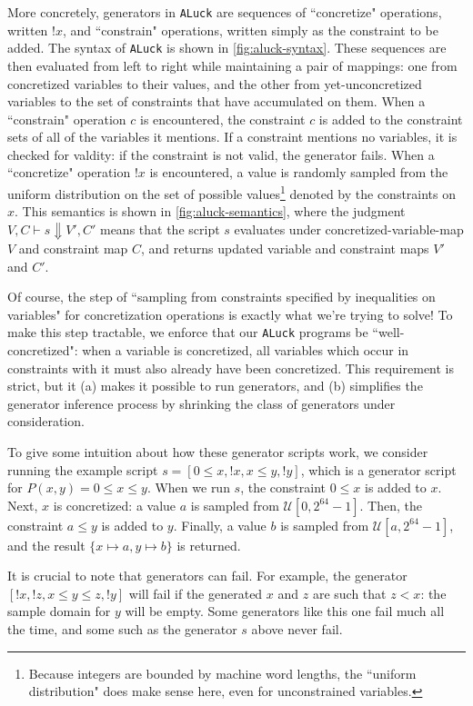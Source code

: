 \documentclass[sigconf,nonacm]{acmart}
\begin{document}
More concretely, generators in \texttt{ALuck} are sequences of ``concretize" operations, written $!x$, and ``constrain" operations, written simply as the constraint to be added. The syntax of \texttt{ALuck} is shown in \autoref{fig:aluck-syntax}. These sequences are then evaluated from left to right while maintaining a pair of mappings: one from concretized variables to their values, and the other from yet-unconcretized variables to the set of constraints that have accumulated on them.
When a ``constrain" operation $c$ is encountered, the constraint $c$ is added to the constraint sets of all of the variables it mentions. If a constraint mentions no variables, it is checked for valdity: if the constraint is not valid, the generator fails. When a ``concretize" operation $!x$ is encountered, a value is randomly sampled from the uniform distribution on the set of possible values\footnote{
Because integers are bounded by machine word lengths, the ``uniform distribution" does make sense here, even for unconstrained variables.
} denoted by the constraints on $x$. This semantics is shown in \autoref{fig:aluck-semantics}, where the judgment $V,C \vdash s \Downarrow V',C'$ means that the script $s$ evaluates under concretized-variable-map $V$ and constraint map $C$, and returns updated variable and constraint maps $V'$ and $C'$.

Of course, the step of ``sampling from constraints specified by inequalities on variables" for concretization operations is exactly what we're trying to solve! To make this step tractable, we enforce that our \texttt{ALuck} programs be ``well-concretized": when a variable is concretized, all variables which occur in constraints with it must also already have been concretized. This requirement is strict, but it (a) makes it possible to run generators, and (b) simplifies the generator inference process by shrinking the class of generators under consideration.

To give some intuition about how these generator scripts work, we consider running the example script $s = [0 \leq x, !x, x \leq y, !y]$, which is a generator 
script for $P(x,y) = 0\leq x \leq y$. When we run $s$, the constraint $0 \leq x$ is added to $x$. Next, $x$ is concretized: a value $a$ is sampled from 
$\mathcal{U}\left[0,2^{64}-1\right]$. Then, the constraint $a \leq y$ is added to $y$. Finally, a value $b$ is sampled from $\mathcal{U}\left[a,2^{64}-1\right]$, and the result $\{x \mapsto a, y \mapsto b\}$ is returned.

It is crucial to note that generators can fail. For example, the generator $[!x,!z, x \leq y \leq z, !y]$ will fail if the generated $x$ and $z$ are such that $z < x$:  the sample domain for $y$ will be empty. Some generators like this one fail much all the time, and some such as the generator $s$ above never fail.
\end{document}
